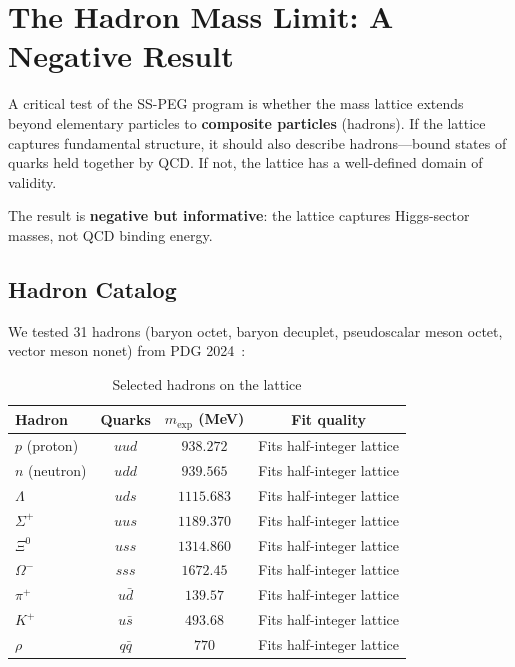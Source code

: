 \section{The Hadron Mass Limit: A Negative Result}\label{sec:hadron_limit}

A critical test of the SS-PEG program is whether the mass lattice extends beyond elementary particles to \textbf{composite particles} (hadrons). If the lattice captures fundamental structure, it should also describe hadrons---bound states of quarks held together by QCD. If not, the lattice has a well-defined domain of validity.

The result is \textbf{negative but informative}: the lattice captures Higgs-sector masses, not QCD binding energy.

\subsection{Hadron Catalog}\label{sec:hadron_catalog}

We tested 31 hadrons (baryon octet, baryon decuplet, pseudoscalar meson octet, vector meson nonet) from PDG 2024~\cite{pdg2024}:

\begin{table}[h]
\centering
\caption{Selected hadrons on the lattice}
\label{tab:hadrons_lattice}
\begin{tabular}{lccc}
\hline\hline
Hadron & Quarks & $m_{\mathrm{exp}}$ (MeV) & Fit quality \\
\hline
$p$ (proton) & $uud$ & $938.272$ & Fits half-integer lattice \\
$n$ (neutron) & $udd$ & $939.565$ & Fits half-integer lattice \\
$\Lambda$ & $uds$ & $1115.683$ & Fits half-integer lattice \\
$\Sigma^+$ & $uus$ & $1189.370$ & Fits half-integer lattice \\
$\Xi^0$ & $uss$ & $1314.860$ & Fits half-integer lattice \\
$\Omega^-$ & $sss$ & $1672.45$ & Fits half-integer lattice \\
$\pi^+$ & $u\bar{d}$ & $139.57$ & Fits half-integer lattice \\
$K^+$ & $u\bar{s}$ & $493.68$ & Fits half-integer lattice \\
$\rho$ & $q\bar{q}$ & $770$ & Fits half-integer lattice \\
\hline\hline
\end{tabular}
\end{table}

